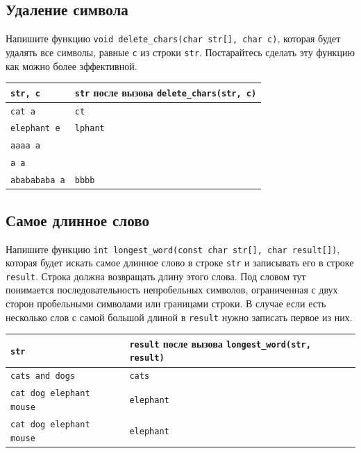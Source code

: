 \documentclass[10pt]{article}
\begin{document}
\subsection{Удаление символа}
Напишите функцию \texttt{void delete\_chars(char str[], char c)}, которая будет удалять все символы, равные \texttt{c} из строки \texttt{str}. Постарайтесь сделать эту функцию как можно более эффективной.

\begin{center}
\begin{tabular}{ l | l }
 \texttt{str, c} & \texttt{str} после вызова \texttt{delete\_chars(str, c)} \\ \hline
 \texttt{cat a} & \texttt{ct} \\
 \texttt{elephant e} & \texttt{lphant} \\
 \texttt{aaaa a} & \texttt{} \\
 \texttt{a a} & \texttt{} \\
 \texttt{ababababa a} & \texttt{bbbb} \\
\end{tabular}
\end{center}


\subsection{Самое длинное слово}
Напишите функцию \texttt{int longest\_word(const char str[], char result[])}, которая будет искать самое длинное слово в строке \texttt{str} и записывать его в строке \texttt{result}. Строка должна возвращать длину этого слова. Под словом тут понимается последовательность непробельных символов, ограниченная с двух сторон пробельными символами или границами строки.
В случае если есть несколько слов с самой большой длиной в \texttt{result} нужно записать первое из них.

\begin{center}
\begin{tabular}{ l | l }
 \texttt{str} & \texttt{result} после вызова \texttt{longest\_word(str, result)} \\ \hline
 \texttt{cats and dogs} & \texttt{cats} \\
 \texttt{cat dog elephant mouse} & \texttt{elephant} \\
 \texttt{cat \quad dog \quad\quad elephant mouse} & \texttt{elephant} \\
\end{tabular}
\end{center}
\end{document}
